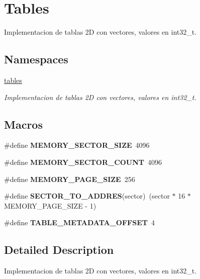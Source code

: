 \hypertarget{group__Tables}{}\section{Tables}
\label{group__Tables}


Implementacion de tablas 2D con vectores, valores en int32\+\_\+t.  


\subsection*{Namespaces}
\begin{DoxyCompactItemize}
\item 
 \hyperlink{namespacetables}{tables}
\begin{DoxyCompactList}\small\item\em Implementacion de tablas 2D con vectores, valores en int32\+\_\+t. \end{DoxyCompactList}\end{DoxyCompactItemize}
\subsection*{Macros}
\begin{DoxyCompactItemize}
\item 
\mbox{\label{group__Tables_ga04fa27dc99bae1e676fd6a65695ab272}} 
\#define {\bfseries M\+E\+M\+O\+R\+Y\+\_\+\+S\+E\+C\+T\+O\+R\+\_\+\+S\+I\+ZE}~4096
\item 
\mbox{\label{group__Tables_ga9544ad8232a908fb374ab10dc85044ea}} 
\#define {\bfseries M\+E\+M\+O\+R\+Y\+\_\+\+S\+E\+C\+T\+O\+R\+\_\+\+C\+O\+U\+NT}~4096
\item 
\mbox{\label{group__Tables_gacec51ea00872290be9953f8a76ba1e2b}} 
\#define {\bfseries M\+E\+M\+O\+R\+Y\+\_\+\+P\+A\+G\+E\+\_\+\+S\+I\+ZE}~256
\item 
\mbox{\label{group__Tables_ga79ab0f4b5245b5d5450e444591d470b2}} 
\#define {\bfseries S\+E\+C\+T\+O\+R\+\_\+\+T\+O\+\_\+\+A\+D\+D\+R\+ES}(sector)~(sector $\ast$ 16 $\ast$ M\+E\+M\+O\+R\+Y\+\_\+\+P\+A\+G\+E\+\_\+\+S\+I\+ZE -\/ 1)
\item 
\mbox{\label{group__Tables_ga5f7eb4decda2972757239c931dc48587}} 
\#define {\bfseries T\+A\+B\+L\+E\+\_\+\+M\+E\+T\+A\+D\+A\+T\+A\+\_\+\+O\+F\+F\+S\+ET}~4
\end{DoxyCompactItemize}


\subsection{Detailed Description}
Implementacion de tablas 2D con vectores, valores en int32\+\_\+t. 

